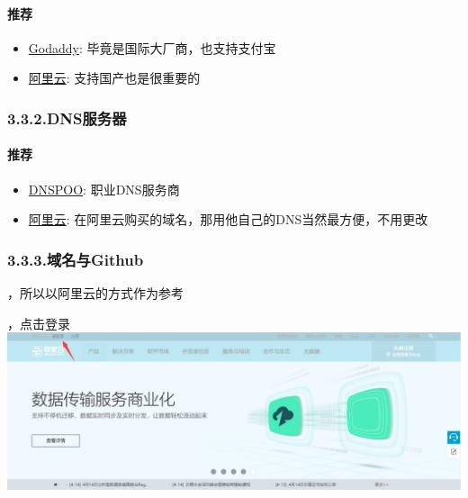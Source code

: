 \documentclass{article}
\begin{document}
\paragraph{推荐}\label{section}%

\begin{itemize}%

\item{}
\href{https://sg.godaddy.com/zh?isc=cjc99com\%26ci=}{Godaddy}: 毕竟是国际大厂商，也支持支付宝%

\item{}
\href{https://www.aliyun.com/?spm=5176.3047821.1.1.POmfMt}{阿里云}: 支持国产也是很重要的%
\end{itemize}%

\subsubsection{3.3.2.\hspace*{0.5em}DNS服务器}\label{sec-dns}%

\paragraph{推荐}\label{section}%

\begin{itemize}[noitemsep,topsep=\mdcompacttopsep]%

\item\href{https://www.dnspod.cn/}{DNSPOO}: 职业DNS服务商%

\item\href{https://www.aliyun.com/?spm=5176.3047821.1.1.POmfMt}{阿里云}: 在阿里云购买的域名，那用他自己的DNS当然最方便，不用更改%
\end{itemize}%

\subsubsection{3.3.3.\hspace*{0.5em}域名与Github}\label{sec-github}%

，所以以阿里云的方式作为参考%

\begin{enumerate}[noitemsep,topsep=\mdcompacttopsep]%

，点击登录
\includegraphics[keepaspectratio=true,width=\dimmin{}{\dimwidth{0.90}}]{images/3}{}%
\end{enumerate}%
\end{document}
